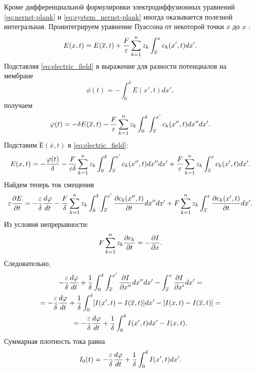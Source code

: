 Кроме дифференциальной формулировки электродиффузионных уравнений
\eqref{eq:nernst-plank} и \eqref{eq:system_nernst-plank} иногда оказывается
полезной интегральная. Проинтегрируем уравнение Пуассона от некоторой точки
\( \overline{x} \) до \( x \) \cite{bib:8}:
\begin{equation}
    E(x, t) = E(\overline{x}, t) + \frac{F}{\varepsilon}\sum_{k=1}^n z_k
    \int_{\overline{x}}^x c_k(x', t) dx'.
    \label{eq:electric_field}
\end{equation}
Подставляя \eqref{eq:electric_field} в выражение для разности потенциалов на мембране
\[
    \phi(t) = -\int_0^\delta E(x', t) dx',
\]
получаем
\[
    \varphi(t) = -\delta E(\overline{x}, t) - \frac{F}{\varepsilon}\sum_{k=1}^n z_k
    \int_0^\delta \int_{\overline{x}}^{x'} c_k(x'', t) dx'' dx'.
\]
Подставим \(Е(\overline{x}, t)\) в \eqref{eq:electric_field}:
\begin{equation}
    E(x, t) = -\frac{\varphi(t)}{\delta} -
    \frac{F}{\varepsilon\delta}\sum_{k=1}^n z_k
    \int_0^\delta \int_{\overline{x}}^{x'} c_k(x'', t) dx'' dx' +
    \frac{F}{\varepsilon}\sum_{k=1}^n z_k\int_{\overline{x}}^x c_k(x', t) dx'.
\end{equation}
Найдем теперь ток смещения
\[
    \varepsilon\frac{\partial E}{\partial t} = -\frac{\varepsilon}{\delta}\frac{d \varphi}{d t} -
    \frac{F}{\delta}\sum_{k=1}^n z_k
    \int_0^\delta \int_{\overline{x}}^{x'} \frac{\partial c_k(x'', t)}{\partial t} dx'' dx' +
    F\sum_{k=1}^n z_k\int_{\overline{x}}^x \frac{\partial c_k(x', t)}{\partial t} dx'.
\]
Из условия непрерывности:
\[
    F\sum_{k=1}^n z_k\frac{\partial c_k}{\partial t} = -\frac{\partial I}{\partial x}.
\]
Следовательно,
\begin{gather*}
    -\frac{\varepsilon}{\delta}\frac{d \varphi}{d t} +
    \frac{1}{\delta}\int_0^\delta \int_{\overline{x}}^{x'} \frac{\partial I}{\partial x''} dx'' dx' -
    \int_{\overline{x}}^x \frac{\partial I}{\partial x'} dx' = \\ =
    -\frac{\varepsilon}{\delta}\frac{d \varphi}{d t} +
    \frac{1}{\delta}\int_0^\delta [I(x', t) - I(\overline{x}, t)] dx' -
    [I(x, t) - I(\overline{x}, t)] = \\ = -\frac{\varepsilon}{\delta}\frac{d \varphi}{d t} +
    \frac{1}{\delta}\int_0^\delta I(x', t) dx' - I(x, t).
\end{gather*}
Суммарная плотность тока равна
\[
    I_0(t) = -\frac{\varepsilon}{\delta}\frac{d \varphi}{d t} +
        \frac{1}{\delta}\int_0^\delta I(x', t) dx'.
\]

